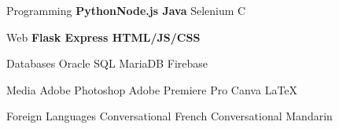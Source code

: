 

\begin{cvskills}

  \cvskill
  {Programming} %
  {\textbf{Python{\enskip\cdotp\enskip}Node.js {\enskip\cdotp\enskip} Java} {\enskip\cdotp\enskip} Selenium {\enskip\cdotp\enskip} C} %

  \cvskill
  {Web} %
  {\textbf{Flask {\enskip\cdotp\enskip} Express {\enskip\cdotp\enskip} HTML/JS/CSS} }%

  \cvskill
  {Databases} %
  {Oracle SQL {\enskip\cdotp\enskip} MariaDB {\enskip\cdotp\enskip} Firebase} %


  \cvskill
  {Media} %
  {Adobe Photoshop {\enskip\cdotp\enskip} Adobe Premiere Pro {\enskip\cdotp\enskip} Canva {\enskip\cdotp\enskip} \LaTeX} %


  \cvskill
  {Foreign Languages} %
  {Conversational French {\enskip\cdotp\enskip} Conversational Mandarin} %

\end{cvskills}
